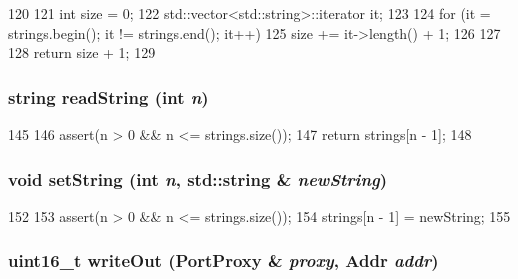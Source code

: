 \begin{DoxyCode}
120 {
121     int size = 0;
122     std::vector<std::string>::iterator it;
123 
124     for (it = strings.begin(); it != strings.end(); it++) {
125         size += it->length() + 1;
126     }
127 
128     return size + 1;
129 }
\end{DoxyCode}
\hypertarget{classX86ISA_1_1SMBios_1_1SMBiosStructure_aea7304527c54463aff456fe8665198f1}{
\subsubsection[{readString}]{\setlength{\rightskip}{0pt plus 5cm}string readString (int {\em n})}}
\label{classX86ISA_1_1SMBios_1_1SMBiosStructure_aea7304527c54463aff456fe8665198f1}



\begin{DoxyCode}
145 {
146     assert(n > 0 && n <= strings.size());
147     return strings[n - 1];
148 }
\end{DoxyCode}
\hypertarget{classX86ISA_1_1SMBios_1_1SMBiosStructure_adf03e658712a91de33e3737cdc0e2bec}{
\subsubsection[{setString}]{\setlength{\rightskip}{0pt plus 5cm}void setString (int {\em n}, \/  std::string \& {\em newString})}}
\label{classX86ISA_1_1SMBios_1_1SMBiosStructure_adf03e658712a91de33e3737cdc0e2bec}



\begin{DoxyCode}
152 {
153     assert(n > 0 && n <= strings.size());
154     strings[n - 1] = newString;
155 }
\end{DoxyCode}
\hypertarget{classX86ISA_1_1SMBios_1_1SMBiosStructure_a2dbf6f51e91cb24abfc247d73c0b857d}{
\subsubsection[{writeOut}]{\setlength{\rightskip}{0pt plus 5cm}uint16\_\-t writeOut ({\bf PortProxy} \& {\em proxy}, \/  {\bf Addr} {\em addr})}}
\label{classX86ISA_1_1SMBios_1_1SMBiosStructure_a2dbf6f51e91cb24abfc247d73c0b857d}


